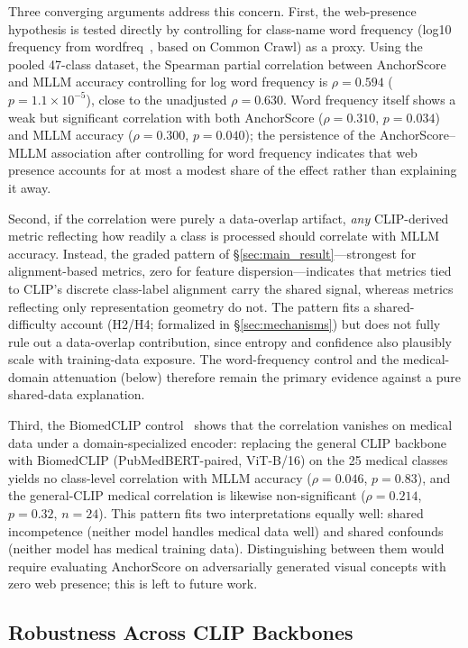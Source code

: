 \documentclass[a4paper,fleqn]{cas-sc}
\begin{document}
Three converging arguments address this concern. First, the web-presence hypothesis is tested directly by controlling for class-name word frequency (log10 frequency from wordfreq~\cite{wordfreq}, based on Common Crawl) as a proxy. Using the pooled 47-class dataset, the Spearman partial correlation between AnchorScore and MLLM accuracy controlling for log word frequency is $\rho=0.594$ ($p=1.1\times10^{-5}$), close to the unadjusted $\rho=0.630$. Word frequency itself shows a weak but significant correlation with both AnchorScore ($\rho=0.310$, $p=0.034$) and MLLM accuracy ($\rho=0.300$, $p=0.040$); the persistence of the AnchorScore--MLLM association after controlling for word frequency indicates that web presence accounts for at most a modest share of the effect rather than explaining it away.

Second, if the correlation were purely a data-overlap artifact, \emph{any} CLIP-derived metric reflecting how readily a class is processed should correlate with MLLM accuracy. Instead, the graded pattern of \S\ref{sec:main_result}---strongest for alignment-based metrics, zero for feature dispersion---indicates that metrics tied to CLIP's discrete class-label alignment carry the shared signal, whereas metrics reflecting only representation geometry do not. The pattern fits a shared-difficulty account (H2/H4; formalized in \S\ref{sec:mechanisms}) but does not fully rule out a data-overlap contribution, since entropy and confidence also plausibly scale with training-data exposure. The word-frequency control and the medical-domain attenuation (below) therefore remain the primary evidence against a pure shared-data explanation.

Third, the BiomedCLIP control~\cite{zhang2023biomedclip} shows that the correlation vanishes on medical data under a domain-specialized encoder: replacing the general CLIP backbone with BiomedCLIP (PubMedBERT-paired, ViT-B/16) on the 25 medical classes yields no class-level correlation with MLLM accuracy ($\rho=0.046$, $p=0.83$), and the general-CLIP medical correlation is likewise non-significant ($\rho=0.214$, $p=0.32$, $n=24$). This pattern fits two interpretations equally well: shared incompetence (neither model handles medical data well) and shared confounds (neither model has medical training data). Distinguishing between them would require evaluating AnchorScore on adversarially generated visual concepts with zero web presence; this is left to future work.

\subsection{Robustness Across CLIP Backbones}
\label{sec:backbone}
\end{document}
